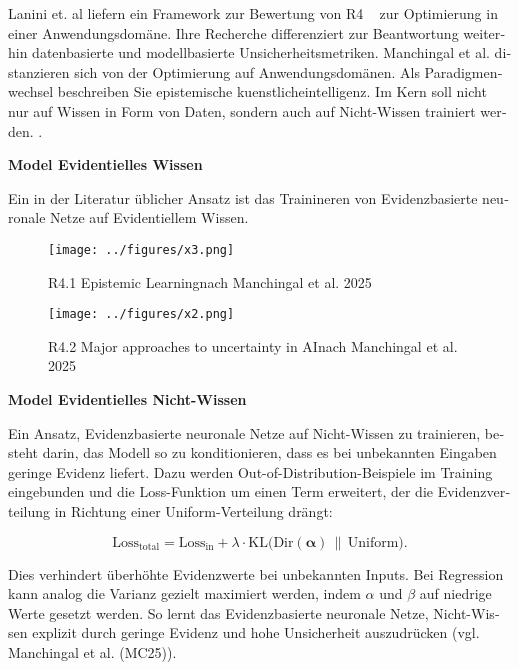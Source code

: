 \begin{otherlanguage}{ngerman}

Lanini et. al liefern ein Framework zur Bewertung von R4 ~\parencite{Lanini2024} zur Optimierung in einer Anwendungsdomäne. Ihre Recherche differenziert zur Beantwortung weiterhin datenbasierte und modellbasierte Unsicherheitsmetriken. 
\newline
Manchingal et al. distanzieren sich von der Optimierung auf Anwendungsdomänen. Als Paradigmenwechsel beschreiben Sie epistemische \gls{kuenstlicheintelligenz}. Im Kern soll nicht nur auf Wissen in Form von Daten, sondern auch auf Nicht-Wissen trainiert werden. \parencite{manchingal2025}. 


\pagebreak


\textbf{Model Evidentielles Wissen}

Ein in der Literatur üblicher Ansatz ist das Trainineren von \gls{Evidenzbasierte neuronale Netze} auf Evidentiellem Wissen. 

\begin{figure}[!ht]
  \centering
  \texttt{[image: ../figures/x3.png]}
  \caption{R4.1 \glqq Epistemic Learning\grqq nach Manchingal et al. 2025}
\end{figure}

\begin{figure}[!ht]
  \centering
  \texttt{[image: ../figures/x2.png]}
  \caption{R4.2 \glqq Major approaches to uncertainty in AI\grqq nach Manchingal et al. 2025}
\end{figure}


\textbf{Model Evidentielles Nicht-Wissen}

Ein Ansatz, \gls{Evidenzbasierte neuronale Netze} auf Nicht-Wissen zu trainieren, besteht darin, das Modell so zu konditionieren, dass es bei unbekannten Eingaben geringe Evidenz liefert. Dazu werden \gls{Out-of-Distribution}-Beispiele im Training eingebunden und die Loss-Funktion um einen Term erweitert, der die Evidenzverteilung in Richtung einer Uniform-Verteilung drängt:

\begin{equation}
\text{Loss}_{\text{total}} 
= \text{Loss}_{\text{in}} 
+ \lambda \cdot \text{KL}\bigl(\text{Dir}(\boldsymbol{\alpha}) \,\|\, \text{Uniform}\bigr).
\end{equation}

Dies verhindert überhöhte Evidenzwerte bei unbekannten Inputs. Bei Regression kann analog die Varianz gezielt maximiert werden, indem $\alpha$ und $\beta$ auf niedrige Werte gesetzt werden. So lernt das \gls{Evidenzbasierte neuronale Netze}, Nicht-Wissen explizit durch geringe Evidenz und hohe Unsicherheit auszudrücken (vgl. Manchingal et al. (MC25)).



\end{otherlanguage}
